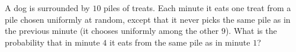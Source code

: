 A dog is surrounded by $10$ piles of treats. Each minute it eats one treat from a pile chosen uniformly at random, except that it never picks the same pile as in the previous minute (it chooses uniformly among the other $9$). What is the probability that in minute $4$ it eats from the same pile as in minute $1$?
